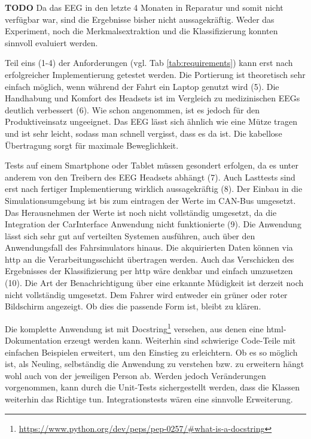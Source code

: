 \label{chap:result}
\textbf{TODO}
Da das EEG in den letzte 4 Monaten in Reparatur und somit nicht verfügbar war, sind die Ergebnisse bisher nicht aussagekräftig. Weder das Experiment, noch die Merkmalsextraktion und die Klassifizierung konnten sinnvoll evaluiert werden. 

Teil eins (1-4) der Anforderungen (vgl. Tab \ref{tab:requirements}) kann erst nach erfolgreicher Implementierung getestet werden. Die Portierung ist theoretisch sehr einfach möglich, wenn während der Fahrt ein Laptop genutzt wird (5). Die Handhabung und Komfort des Headsets ist im Vergleich zu medizinischen EEGs deutlich verbessert (6). Wie schon angenommen, ist es jedoch für den Produktiveinsatz ungeeignet. Das EEG lässt sich ähnlich wie eine Mütze tragen und ist sehr leicht, sodass man schnell vergisst, dass es da ist. Die kabellose Übertragung sorgt für maximale Beweglichkeit.

Tests auf einem Smartphone oder Tablet müssen gesondert erfolgen, da es unter anderem von den Treibern des EEG Headsets abhängt (7). Auch Lasttests sind erst nach fertiger Implementierung wirklich aussagekräftig (8). Der Einbau in die Simulationsumgebung ist bis zum eintragen der Werte im CAN-Bus umgesetzt. Das Herausnehmen der Werte ist noch nicht vollständig umgesetzt, da die Integration der CarInterface Anwendung nicht funktionierte (9). Die Anwendung lässt sich sehr gut auf verteilten Systemen ausführen, auch über den Anwendungsfall des Fahrsimulators hinaus. Die akquirierten Daten können via http an die Verarbeitungsschicht übertragen werden. Auch das Verschicken des Ergebnisses der Klassifizierung per http wäre denkbar und einfach umzusetzen (10). Die Art der Benachrichtigung über eine erkannte Müdigkeit ist derzeit noch nicht vollständig umgesetzt. Dem Fahrer wird entweder ein grüner oder roter Bildschirm angezeigt. Ob dies die passende Form ist, bleibt zu klären.

Die komplette Anwendung ist mit Docstring\footnote{\url{https://www.python.org/dev/peps/pep-0257/\#what-is-a-docstring}} versehen, aus denen eine html-Dokumentation erzeugt werden kann. Weiterhin sind schwierige Code-Teile mit einfachen Beispielen erweitert, um den Einstieg zu erleichtern. Ob es so möglich ist, als Neuling, selbständig die Anwendung zu verstehen bzw. zu erweitern hängt wohl auch von der jeweiligen Person ab. Werden jedoch Veränderungen vorgenommen, kann durch die Unit-Tests sichergestellt werden, dass die Klassen weiterhin das Richtige tun. Integrationstests wären eine sinnvolle  Erweiterung.